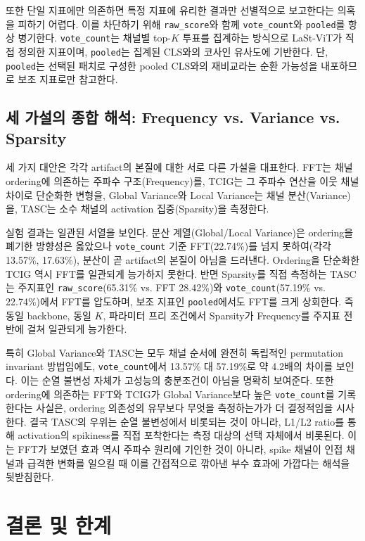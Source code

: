 \documentclass[10pt,twocolumn,letterpaper]{article}
\newcommand{\rawscore}{\texttt{raw\_score}}
\newcommand{\votecount}{\texttt{vote\_count}}
\newcommand{\pooled}{\texttt{pooled}}
\begin{document}
또한 단일 지표에만 의존하면 특정 지표에 유리한 결과만 선별적으로 보고한다는 의혹을 피하기 어렵다. 이를 차단하기 위해 \rawscore{}와 함께 \votecount{}와 \pooled{}를 항상 병기한다. \votecount{}는 채널별 top-$K$ 투표를 집계하는 방식으로 LaSt-ViT가 직접 정의한 지표이며, \pooled{}는 집계된 CLS와의 코사인 유사도에 기반한다. 단, \pooled{}는 선택된 패치로 구성한 pooled CLS와의 재비교라는 순환 가능성을 내포하므로 보조 지표로만 참고한다.

\subsection{세 가설의 종합 해석: Frequency vs. Variance vs. Sparsity}

세 가지 대안은 각각 artifact의 본질에 대한 서로 다른 가설을 대표한다. FFT는 채널 ordering에 의존하는 주파수 구조(Frequency)를, TCIG는 그 주파수 연산을 이웃 채널 차이로 단순화한 변형을, Global Variance와 Local Variance는 채널 분산(Variance)을, TASC는 소수 채널의 activation 집중(Sparsity)을 측정한다.

실험 결과는 일관된 서열을 보인다. 분산 계열(Global/Local Variance)은 ordering을 폐기한 방향성은 옳았으나 \votecount{} 기준 FFT(22.74\%)를 넘지 못하여(각각 13.57\%, 17.63\%), 분산이 곧 artifact의 본질이 아님을 드러낸다. Ordering을 단순화한 TCIG 역시 FFT를 일관되게 능가하지 못한다. 반면 Sparsity를 직접 측정하는 TASC는 주지표인 \rawscore{}(65.31\% vs. FFT 28.42\%)와 \votecount{}(57.19\% vs. 22.74\%)에서 FFT를 압도하며, 보조 지표인 \pooled{}에서도 FFT를 크게 상회한다. 즉 동일 backbone, 동일 $K$, 파라미터 프리 조건에서 Sparsity가 Frequency를 주지표 전반에 걸쳐 일관되게 능가한다.

특히 Global Variance와 TASC는 모두 채널 순서에 완전히 독립적인 permutation invariant 방법임에도, \votecount{}에서 13.57\% 대 57.19\%로 약 4.2배의 차이를 보인다. 이는 순열 불변성 자체가 고성능의 충분조건이 아님을 명확히 보여준다. 또한 ordering에 의존하는 FFT와 TCIG가 Global Variance보다 높은 \votecount{}를 기록한다는 사실은, ordering 의존성의 유무보다 무엇을 측정하는가가 더 결정적임을 시사한다. 결국 TASC의 우위는 순열 불변성에서 비롯되는 것이 아니라, L1/L2 ratio를 통해 activation의 spikiness를 직접 포착한다는 측정 대상의 선택 자체에서 비롯된다. 이는 FFT가 보였던 효과 역시 주파수 원리에 기인한 것이 아니라, spike 채널이 인접 채널과 급격한 변화를 일으킬 때 이를 간접적으로 깎아낸 부수 효과에 가깝다는 해석을 뒷받침한다.

\section{결론 및 한계}
\end{document}
